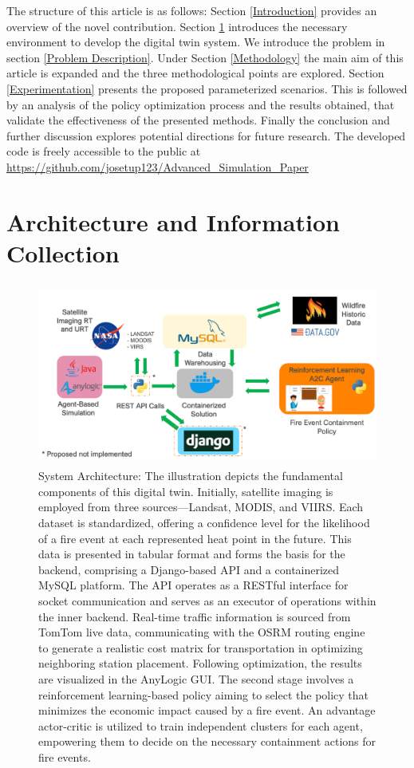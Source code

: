 \documentclass{scspaperproc}
\theoremstyle{scsthe}
\begin{document}
The structure of this article is as follows: Section \ref{Introduction} provides an overview of the novel contribution. Section \ref{Architecture and Information Collection} introduces the necessary environment to develop the digital twin system. We introduce the problem in section \ref{Problem Description}. Under Section \ref{Methodology} the main aim of this article is expanded and the three methodological points are explored. Section \ref{Experimentation} presents the proposed parameterized scenarios. This is followed by an analysis of the policy optimization process and the results obtained, that validate the effectiveness of the presented methods. Finally the conclusion and further discussion explores potential directions for future research. The developed code is freely accessible to the public at \url{https://github.com/josetup123/Advanced_Simulation_Paper}

\section{Architecture and Information Collection}\label{Architecture and Information Collection}
  

\begin{figure}
  \centering
  \includegraphics[height=6cm,width=12cm]{Arch.png}
  \caption{
    System Architecture: The illustration depicts the fundamental components of this digital twin. Initially, satellite imaging is employed from three sources—Landsat, MODIS, and VIIRS. Each dataset is standardized, offering a confidence level for the likelihood of a fire event at each represented heat point in the future. This data is presented in tabular format and forms the basis for the backend, comprising a Django-based API and a containerized MySQL platform. The API operates as a RESTful interface for socket communication and serves as an executor of operations within the inner backend. Real-time traffic information is sourced from TomTom live data, communicating with the OSRM routing engine to generate a realistic cost matrix for transportation in optimizing neighboring station placement. Following optimization, the results are visualized in the AnyLogic GUI. The second stage involves a reinforcement learning-based policy aiming to select the policy that minimizes the economic impact caused by a fire event. An advantage actor-critic is utilized to train independent clusters for each agent, empowering them to decide on the necessary containment actions for fire events. }\label{fig:arch}
  
\end{figure}
\end{document}
